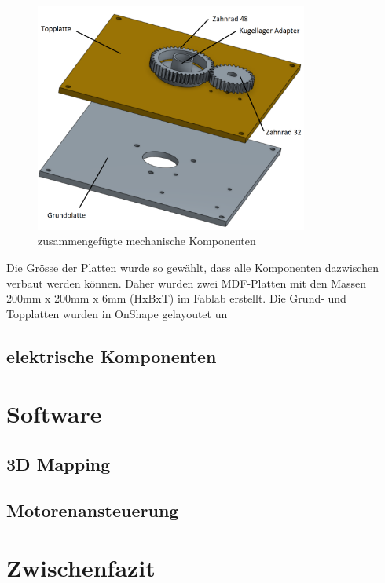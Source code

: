 \begin{figure}[H]
	\centering
	\includegraphics[width=0.8\textwidth]{resources/mechKomp2.PNG}
	\caption{zusammengefügte mechanische Komponenten}
	\label{fig:mechKomp}
\end{figure} 


Die Grösse der Platten wurde so gewählt, dass alle Komponenten dazwischen verbaut werden können. Daher wurden zwei MDF-Platten mit den Massen 200mm x 200mm x 6mm (HxBxT) im Fablab erstellt. Die Grund- und Topplatten wurden in OnShape gelayoutet un 
\subsection {elektrische Komponenten}
\label{sec:elekKomp}




\section{Software}
\label{sec:SoftwareReal}

%  


\subsection {3D Mapping}
\label{sec:3DMapping}

\subsection {Motorenansteuerung}
\label{sec:Motorenansteuerung}

\section{Zwischenfazit}
\label{sec:ZwischenfazitReal}